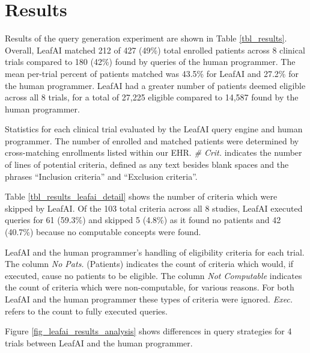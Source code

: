 \documentclass[../main.tex]{subfiles}
\begin{document}
\section{Results}

Results of the query generation experiment are shown in Table \ref{tbl_results}. Overall, LeafAI matched 212 of 427 (49\%) total enrolled patients across 8 clinical trials compared to 180 (42\%) found by queries of the human programmer. The mean per-trial percent of patients matched was 43.5\% for LeafAI and 27.2\% for the human programmer. LeafAI had a greater number of patients deemed eligible across all 8 trials, for a total of 27,225 eligible compared to 14,587 found by the human programmer. 

\begin{table}[h!]
    \small
    \centering
    
    \caption{Statistics for each clinical trial evaluated by the LeafAI query engine and human programmer. The number of enrolled and matched patients were determined by cross-matching enrollments listed within our EHR. \textit{\# Crit.} indicates the number of lines of potential criteria, defined as any text besides blank spaces and the phrases “Inclusion criteria” and “Exclusion criteria”.}
    \label{tbl_results}
\end{table} 

Table \ref{tbl_results_leafai_detail} shows the number of criteria which were skipped by LeafAI. Of the 103 total criteria across all 8 studies, LeafAI executed queries for 61 (59.3\%) and skipped 5 (4.8\%) as it found no patients and 42 (40.7\%) because no computable concepts were found. 

\begin{table}[h!]
    \footnotesize
    \centering
    
    \caption{LeafAI and the human programmer’s handling of eligibility criteria for each trial. The column \textit{No Pats.} (Patients) indicates the count of criteria which would, if executed, cause no patients to be eligible. The column \textit{Not Computable} indicates the count of criteria which were non-computable, for various reasons. For both LeafAI and the human programmer these types of criteria were ignored. \textit{Exec.} refers to the count to fully executed queries.}
    \label{tbl_results_leafai_detail}
\end{table} 

Figure \ref{fig_leafai_results_analysis} shows differences in query strategies for 4 trials between LeafAI and the human programmer. 
\end{document}
